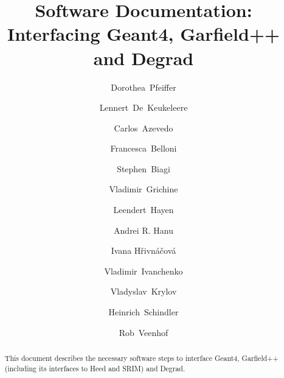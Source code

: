 \documentclass[preprint,12pt,sort&compress]{elsarticle}
\begin{document}
\begin{frontmatter}



\title{Software Documentation: Interfacing Geant4, Garfield++ and Degrad}


\author[add1,add2]{Dorothea~Pfeiffer}
\author[add3]{Lennert~De~Keukeleere}
\author[add4]{Carlos~Azevedo}
\author[add5]{Francesca~Belloni}
\author[add6]{Stephen~Biagi}
\author[add7]{Vladimir~Grichine}
\author[add3]{Leendert~Hayen}
\author[add8]{Andrei R. Hanu}
\author[add9]{Ivana H\v{r}ivn\'{a}\v{c}ov\'{a}}
\author[add2,add10]{Vladimir~Ivanchenko}
\author[add11,add12]{Vladyslav~Krylov}
\author[add2]{Heinrich~Schindler}
\author[add2,add13]{Rob~Veenhof}


\address[add1]{European Spallation Source (ESS AB),P.O. Box 176, SE-22100 Lund, Sweden}%
\address[add2]{CERN, CH-1211 Geneva 23, Switzerland}%
\address[add3]{Instituut voor Kern- en Stralingsfysica, KU Leuven, Belgium}%
\address[add4]{I3N - Physics Department, University of Aveiro, 3810-193 Aveiro, Portugal}%
\address[add5]{CEA Saclay, 91191 Gif-sur-Yvette, France}%
\address[add6]{Department of Physics, University of Liverpool, UK}%
\address[add7]{Lebedev Physical Institute of RAS, Moscow, Russia}%
\address[add8]{NASA Goddard Space Flight Center, Greenbelt, Maryland 20771, USA}%
\address[add9]{Institut de Physique Nucl\'{e}aire, Universit\'{e} Paris-Sud, CNRS-IN2P3, Orsay, France}%
\address[add10]{Tomsk State University, Tomsk, Russia}%
\address[add11]{Laboratoire de l'Acc\'{e}l\'{e}rateur Lin\'{e}aire (LAL), Universit\'{e} Paris-Sud XI, CNRS/IN2P3, 91898 Orsay, France}%
\address[add12]{Taras Shevchenko National University of Kyiv (TSNUK), Kyiv, Ukraine}%
\address[add13]{Uludag University, 16059 N{\"u}lufer-Bursa, Turkey}%



\begin{abstract}
This document describes the necessary software steps to interface Geant4, Garfield++ (including its interfaces to Heed and SRIM) and Degrad. 
\end{abstract}

\end{frontmatter}
\end{document}

